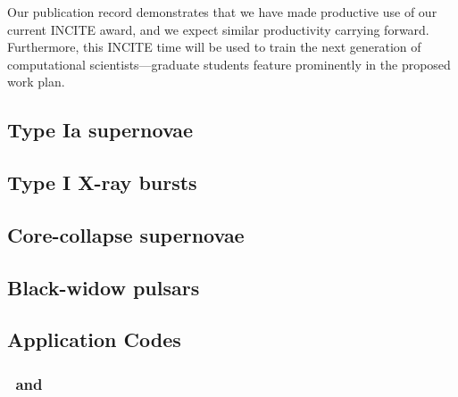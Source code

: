 \documentclass[11pt,letterpaper,english]{article}
\begin{document}
Our publication record demonstrates that we have made productive use
of our current INCITE award, and we expect similar productivity
carrying forward.  Furthermore, this INCITE time will be used to train
the next generation of computational scientists---graduate students
feature prominently in the proposed work plan.


\subsection{Type Ia supernovae}




\subsection{Type I X-ray bursts}




\subsection{Core-collapse supernovae}




\subsection{Black-widow pulsars}




\subsection{Application Codes}

\subsubsection{\maestro\ and \castro}
\end{document}
